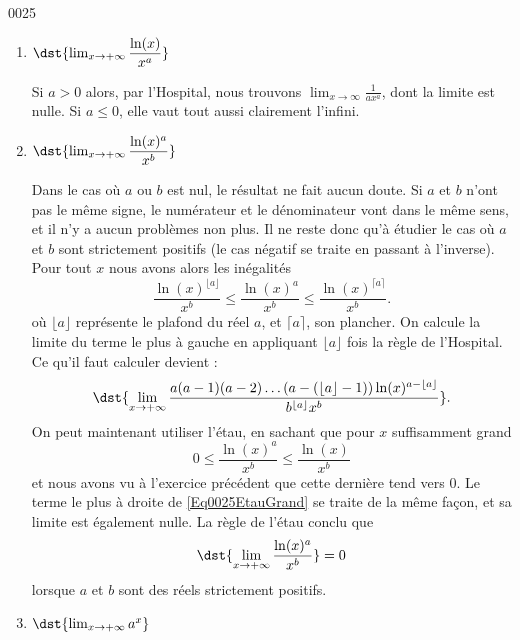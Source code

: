 
\begin{corrige}{0025}



\begin{enumerate}
\item 
 $\dst{\lim_{x\rightarrow +\infty} \dfrac{\ln(x)}{x^a} } $

Si $a>0$ alors, par l'Hospital, nous trouvons $\lim_{x\to\infty}\frac{1}{ ax^a }$, dont la limite est nulle. Si $a\leq0$, elle vaut tout aussi clairement l'infini.

\item
  $\dst{\lim_{x\rightarrow +\infty} \dfrac{\ln(x)^a}{x^b} } $

Dans le cas où $a$ ou $b$ est nul, le résultat ne fait aucun doute. Si $a$ et $b$ n'ont pas le même signe, le numérateur et le dénominateur vont dans le même sens, et il n'y a aucun problèmes non plus. Il ne reste donc qu'à étudier le cas où $a$ et $b$ sont strictement positifs (le cas négatif se traite en passant à l'inverse). Pour tout $x$ nous avons alors les inégalités
\begin{equation}		\label{Eq0025EtauGrand}
	\frac{ \ln(x)^{\lfloor a\rfloor} }{ x^b }\leq\frac{ \ln(x)^{a} }{ x^b }\leq\frac{ \ln(x)^{\lceil a\rceil} }{ x^b }.
\end{equation}
où $\lfloor a \rfloor$ représente le plafond du réel $a$, et $\lceil a\rceil$, son plancher. On calcule la limite du terme le plus à gauche en appliquant $\lfloor a\rfloor$ fois la règle de l'Hospital. Ce qu'il faut calculer devient :
\[ 
\dst{\lim_{x\rightarrow +\infty} \dfrac{a(a-1)(a-2)\ldots(a-(\lfloor a \rfloor-1))\ln(x)^{a-\lfloor a \rfloor}}{b^{\lfloor a \rfloor}x^b} }.
\]
On peut maintenant utiliser l'étau, en sachant que pour $x$ suffisamment grand \[0 \leq \dfrac{\ln(x)^a}{x^b} \leq \dfrac{\ln(x)}{x^b}\] et nous avons vu à l'exercice précédent que cette dernière tend vers $0$. Le terme le plus à droite de \eqref{Eq0025EtauGrand} se traite de la même façon, et sa limite est également nulle. La règle de l'étau conclu que
\begin{equation}
	\dst{\lim_{x\rightarrow +\infty} \dfrac{\ln(x)^a}{x^b} } =0
\end{equation}
lorsque $a$ et $b$ sont des réels strictement positifs.

\item
 $\dst{\lim_{x\rightarrow +\infty} a^x} $


\end{enumerate}
\end{corrige}
